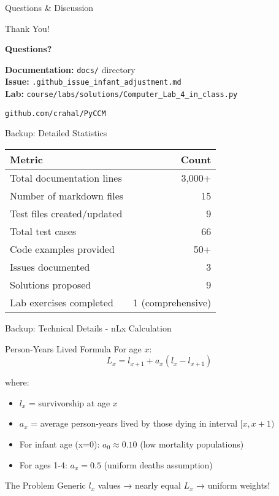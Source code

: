 \documentclass[aspectratio=169]{beamer}
\begin{document}
\begin{frame}{Questions \& Discussion}
\begin{center}
\Huge Thank You!

\vspace{1cm}

\Large
\textbf{Questions?}

\vspace{1cm}

\normalsize
\textbf{Documentation:} \texttt{docs/} directory\\
\textbf{Issue:} \texttt{.github\_issue\_infant\_adjustment.md}\\
\textbf{Lab:} \texttt{course/labs/solutions/Computer\_Lab\_4\_in\_class.py}

\vspace{0.5cm}

\texttt{github.com/crahal/PyCCM}
\end{center}
\end{frame}

\appendix

\begin{frame}{Backup: Detailed Statistics}
\begin{table}
\small
\begin{tabular}{lr}
\toprule
\textbf{Metric} & \textbf{Count} \\
\midrule
Total documentation lines & 3,000+ \\
Number of markdown files & 15 \\
Test files created/updated & 9 \\
Total test cases & 66 \\
Code examples provided & 50+ \\
Issues documented & 3 \\
Solutions proposed & 9 \\
Lab exercises completed & 1 (comprehensive) \\
\bottomrule
\end{tabular}
\end{table}
\end{frame}

\begin{frame}{Backup: Technical Details - nLx Calculation}
\begin{block}{Person-Years Lived Formula}
For age $x$:
$$L_x = l_{x+1} + a_x (l_x - l_{x+1})$$

where:
\begin{itemize}
    \item $l_x$ = survivorship at age $x$
    \item $a_x$ = average person-years lived by those dying in interval $[x, x+1)$
    \item For infant age (x=0): $a_0 \approx 0.10$ (low mortality populations)
    \item For ages 1-4: $a_x = 0.5$ (uniform deaths assumption)
\end{itemize}
\end{block}

\begin{alertblock}{The Problem}
Generic $l_x$ values → nearly equal $L_x$ → uniform weights!
\end{alertblock}
\end{frame}
\end{document}
